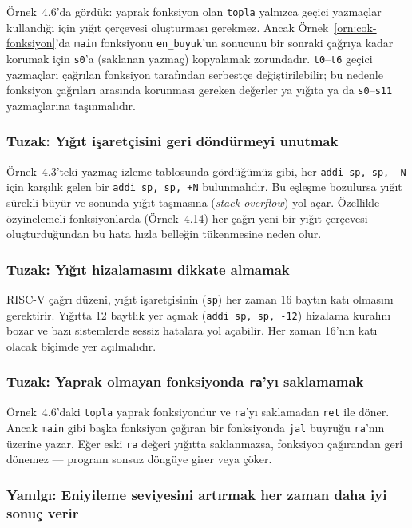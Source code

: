 Örnek~4.6'da gördük: yaprak fonksiyon olan \texttt{topla} yalnızca geçici yazmaçlar kullandığı için yığıt çerçevesi oluşturması gerekmez. Ancak Örnek~\ref{orn:cok-fonksiyon}'da \texttt{main} fonksiyonu \texttt{en\_buyuk}'un sonucunu bir sonraki çağrıya kadar korumak için \texttt{s0}'a (saklanan yazmaç) kopyalamak zorundadır. \texttt{t0}--\texttt{t6} geçici yazmaçları çağrılan fonksiyon tarafından serbestçe değiştirilebilir; bu nedenle fonksiyon çağrıları arasında korunması gereken değerler ya yığıta ya da \texttt{s0}--\texttt{s11} yazmaçlarına taşınmalıdır.

\subsubsection*{Tuzak: Yığıt işaretçisini geri döndürmeyi unutmak}

Örnek~4.3'teki yazmaç izleme tablosunda gördüğümüz gibi, her \texttt{addi sp, sp, -N} için karşılık gelen bir \texttt{addi sp, sp, +N} bulunmalıdır. Bu eşleşme bozulursa yığıt sürekli büyür ve sonunda yığıt taşmasına (\emph{stack overflow}) yol açar. Özellikle özyinelemeli fonksiyonlarda (Örnek~4.14) her çağrı yeni bir yığıt çerçevesi oluşturduğundan bu hata hızla belleğin tükenmesine neden olur.

\subsubsection*{Tuzak: Yığıt hizalamasını dikkate almamak}

RISC-V çağrı düzeni, yığıt işaretçisinin (\texttt{sp}) her zaman 16 baytın katı olmasını gerektirir. Yığıtta 12 baytlık yer açmak (\texttt{addi sp, sp, -12}) hizalama kuralını bozar ve bazı sistemlerde sessiz hatalara yol açabilir. Her zaman 16'nın katı olacak biçimde yer açılmalıdır.

\subsubsection*{Tuzak: Yaprak olmayan fonksiyonda \texttt{ra}'yı saklamamak}

Örnek~4.6'daki \texttt{topla} yaprak fonksiyondur ve \texttt{ra}'yı saklamadan \texttt{ret} ile döner. Ancak \texttt{main} gibi başka fonksiyon çağıran bir fonksiyonda \texttt{jal} buyruğu \texttt{ra}'nın üzerine yazar. Eğer eski \texttt{ra} değeri yığıtta saklanmazsa, fonksiyon çağırandan geri dönemez --- program sonsuz döngüye girer veya çöker.

\subsubsection*{Yanılgı: Eniyileme seviyesini artırmak her zaman daha iyi sonuç verir}

